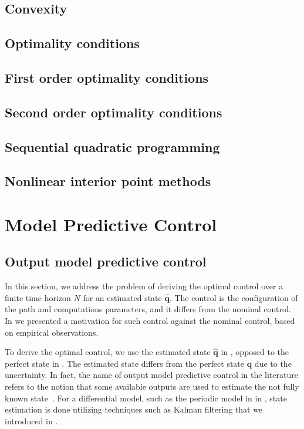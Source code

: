 \subsection{\color{red}Convexity}

\subsection{\color{red}Optimality conditions}

\subsection{\color{orange}First order optimality conditions}

\subsection{\color{orange}Second order optimality conditions}

\subsection{\color{orange}Sequential quadratic programming}

\subsection{\color{orange}Nonlinear interior point methods}


\section{\color{cyan}Model Predictive Control}



\subsection{Output model predictive control}
\label{sec:output-mpc}

In this section, we address the problem of deriving the optimal control over a finite time horizon $N$ for an estimated state $\hat{\mathbf{q}}$. The control is the configuration of the path and computations parameters, and it differs from the nominal control. In  we presented a motivation for such control against the nominal control, based on empirical observations.  

To derive the optimal control, we use the estimated state $\hat{\mathbf{q}}$ in , opposed to the perfect state in . The estimated state differs from the perfect state $\mathbf{q}$ due to the uncertainty. In fact, the name of output model predictive control in the literature refers to the notion that some available outputs are used to estimate the not fully known state~\citep{rawlings2017model}. For a differential model, such as the periodic model in  in , state estimation is done utilizing techniques such as Kalman filtering that we introduced in .

